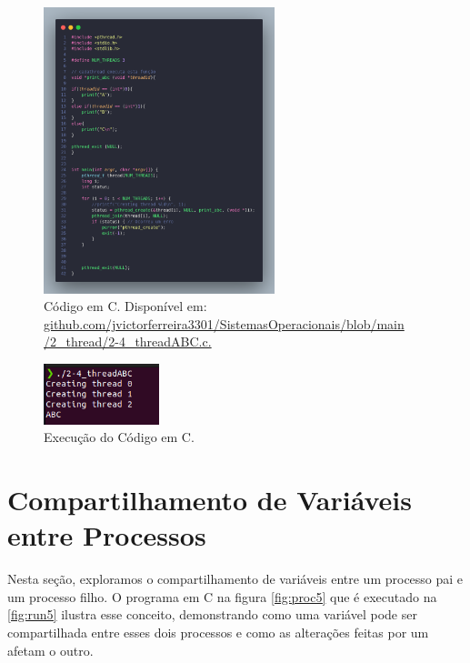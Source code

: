 \documentclass[
	12pt,				%
	openright,			%
	oneside,			%
	a4paper,			%
	chapter=TITLE,		%
	english,			%
	french,				%
	spanish,			%
	brazil				%
	]{abntex2}
\theoremstyle{definition}
\begin{document}
\begin{figure}
    \centering
    \includegraphics[width=0.6\textwidth]{imagens/processos_4.png}
	\caption{Código em C. Disponível em: \href{https://github.com/jvictorferreira3301/Sistemas_Operacionais/blob/main/2_thread/2-4_threadABC.c}{github.com/jvictorferreira3301/SistemasOperacionais/blob/main
    /2\_thread/2-4\_threadABC.c.}}
	\label{fig:proc4}
\end{figure}

\begin{figure}
    \centering
    \includegraphics[width=0.3\textwidth]{imagens/run_processos_4.png}
    \caption{Execução do Código em C.}
    \label{fig:run4}
\end{figure}

\section{Compartilhamento de Variáveis entre Processos}

Nesta seção, exploramos o compartilhamento de variáveis entre um processo pai e um 
processo filho. O programa em C na figura \ref{fig:proc5} que é executado na \ref{fig:run5} ilustra esse conceito, demonstrando 
como uma variável pode ser compartilhada entre esses dois processos e como as alterações 
feitas por um afetam o outro.
\end{document}

